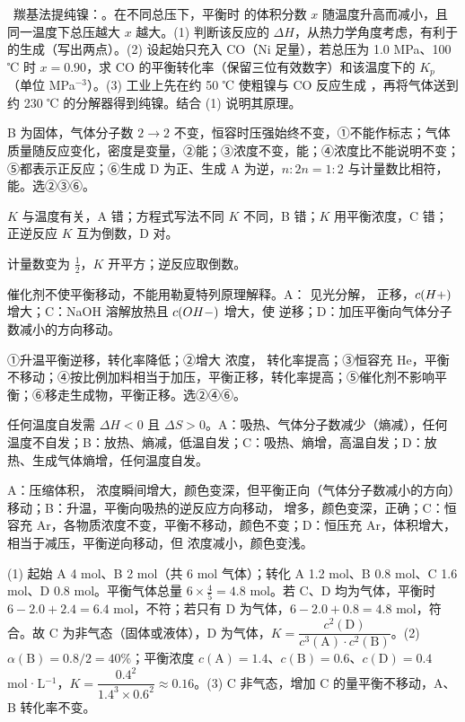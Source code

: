 \begin{xiti}
\item {}\ 羰基法提纯镍：。在不同总压下，平衡时  的体积分数 $x$ 随温度升高而减小，且同一温度下总压越大 $x$ 越大。(1) 判断该反应的 $\Delta H$，从热力学角度考虑，\tk{}有利于  的生成（写出两点）。(2) 设起始只充入 CO（Ni 足量），若总压为 1.0 MPa、100 ℃ 时 $x=0.90$，求 CO 的平衡转化率（保留三位有效数字）和该温度下的 $K_p$（单位 MPa$^{-3}$）。(3) 工业上先在约 50 ℃ 使粗镍与 CO 反应生成 ，再将气体送到约 230 ℃ 的分解器得到纯镍。结合 (1) 说明其原理。
\end{xiti}

\begin{jiexilist}
\item {}B 为固体，气体分子数 $2\to2$ 不变，恒容时压强始终不变，①不能作标志；气体质量随反应变化，密度是变量，②能；③浓度不变，能；④浓度比不能说明不变；⑤都表示正反应；⑥生成 D 为正、生成 A 为逆，$n:2n=1:2$ 与计量数比相符，能。选②③⑥。
\item {}$K$ 与温度有关，A 错；方程式写法不同 $K$ 不同，B 错；$K$ 用平衡浓度，C 错；正逆反应 $K$ 互为倒数，D 对。
\item {}计量数变为 $\frac12$，$K$ 开平方；逆反应取倒数。
\item {}催化剂不使平衡移动，不能用勒夏特列原理解释。A： 见光分解， 正移，$c(H+)$ 增大；C：NaOH 溶解放热且 $c(OH-)$ 增大，使  逆移；D：加压平衡向气体分子数减小的方向移动。
\item {}①升温平衡逆移，转化率降低；②增大  浓度， 转化率提高；③恒容充 He，平衡不移动；④按比例加料相当于加压，平衡正移，转化率提高；⑤催化剂不影响平衡；⑥移走生成物，平衡正移。选②④⑥。
\item {}任何温度自发需 $\Delta H<0$ 且 $\Delta S>0$。A：吸热、气体分子数减少（熵减），任何温度不自发；B：放热、熵减，低温自发；C：吸热、熵增，高温自发；D：放热、生成气体熵增，任何温度自发。
\item {}A：压缩体积， 浓度瞬间增大，颜色变深，但平衡正向（气体分子数减小的方向）移动；B：升温，平衡向吸热的逆反应方向移动， 增多，颜色变深，正确；C：恒容充 Ar，各物质浓度不变，平衡不移动，颜色不变；D：恒压充 Ar，体积增大，相当于减压，平衡逆向移动，但  浓度减小，颜色变浅。
\item (1) 起始 A 4 mol、B 2 mol（共 6 mol 气体）；转化 A 1.2 mol、B 0.8 mol、C 1.6 mol、D 0.8 mol。平衡气体总量 $6\times\frac45=4.8$ mol。若 C、D 均为气体，平衡时 $6-2.0+2.4=6.4$ mol，不符；若只有 D 为气体，$6-2.0+0.8=4.8$ mol，符合。故 C 为非气态（固体或液体），D 为气体，$K=\dfrac{c^2(\mathrm{D})}{c^3(\mathrm{A})\cdot c^2(\mathrm{B})}$。(2) $\alpha(\mathrm{B})=0.8/2=40\%$；平衡浓度 $c(\mathrm{A})=1.4$、$c(\mathrm{B})=0.6$、$c(\mathrm{D})=0.4$ mol·L$^{-1}$，$K=\dfrac{0.4^2}{1.4^3\times0.6^2}\approx0.16$。(3) C 非气态，增加 C 的量平衡不移动，A、B 转化率不变。

\end{jiexilist}
